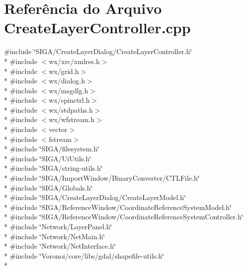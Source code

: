 \section{Referência do Arquivo Create\+Layer\+Controller.\+cpp}
\label{_create_layer_controller_8cpp}
{\ttfamily \#include \char`\"{}S\+I\+G\+A/\+Create\+Layer\+Dialog/\+Create\+Layer\+Controller.\+h\char`\"{}}\\*
{\ttfamily \#include $<$wx/xrc/xmlres.\+h$>$}\\*
{\ttfamily \#include $<$wx/grid.\+h$>$}\\*
{\ttfamily \#include $<$wx/dialog.\+h$>$}\\*
{\ttfamily \#include $<$wx/msgdlg.\+h$>$}\\*
{\ttfamily \#include $<$wx/spinctrl.\+h$>$}\\*
{\ttfamily \#include $<$wx/stdpaths.\+h$>$}\\*
{\ttfamily \#include $<$wx/wfstream.\+h$>$}\\*
{\ttfamily \#include $<$vector$>$}\\*
{\ttfamily \#include $<$fstream$>$}\\*
{\ttfamily \#include \char`\"{}S\+I\+G\+A/filesystem.\+h\char`\"{}}\\*
{\ttfamily \#include \char`\"{}S\+I\+G\+A/\+Ui\+Utils.\+h\char`\"{}}\\*
{\ttfamily \#include \char`\"{}S\+I\+G\+A/string-\/utils.\+h\char`\"{}}\\*
{\ttfamily \#include \char`\"{}S\+I\+G\+A/\+Import\+Window/\+Binary\+Converter/\+C\+T\+L\+File.\+h\char`\"{}}\\*
{\ttfamily \#include \char`\"{}S\+I\+G\+A/\+Globals.\+h\char`\"{}}\\*
{\ttfamily \#include \char`\"{}S\+I\+G\+A/\+Create\+Layer\+Dialog/\+Create\+Layer\+Model.\+h\char`\"{}}\\*
{\ttfamily \#include \char`\"{}S\+I\+G\+A/\+Reference\+Window/\+Coordinate\+Reference\+System\+Model.\+h\char`\"{}}\\*
{\ttfamily \#include \char`\"{}S\+I\+G\+A/\+Reference\+Window/\+Coordinate\+Reference\+System\+Controller.\+h\char`\"{}}\\*
{\ttfamily \#include \char`\"{}Network/\+Layer\+Panel.\+h\char`\"{}}\\*
{\ttfamily \#include \char`\"{}Network/\+Net\+Main.\+h\char`\"{}}\\*
{\ttfamily \#include \char`\"{}Network/\+Net\+Interface.\+h\char`\"{}}\\*
{\ttfamily \#include \char`\"{}Voronoi/core/libs/gdal/shapefile-\/utils.\+h\char`\"{}}\\*
